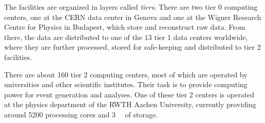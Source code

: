 The facilities are organized in layers called \emph{tiers}. There are two tier 0 computing centers, one at the \ac{CERN} data center in Geneva and one at the Wigner Research Centre for Physics in Budapest, which store and reconstruct raw data. From there, the data are distributed to one of the 13 tier 1 data centers worldwide, where they are further processed, stored for safe-keeping and distributed to tier 2 facilities.

There are about 160 tier 2 computing centers, most of which are operated by universities and other scientific institutes. Their task is to provide computing power for event generation and analyses\cite{CERN:Gridsystemtiers,WLCG:Tiercentres}. One of these tier 2 centers is operated at the physics department of the RWTH Aachen University, currently providing around \num{5200} processing cores and \SI{3}{\peta\byte} of storage\cite{UniRWTHAachenIII.PhysikalischesInstitut:GridComputing}. 
